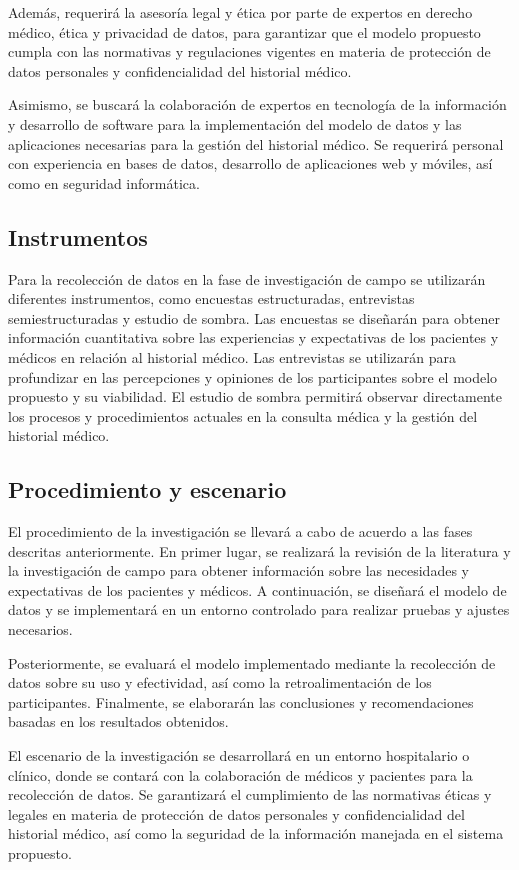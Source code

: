     Además, requerirá la asesoría legal y ética por parte de expertos en derecho médico, ética y privacidad de datos, para garantizar que el modelo propuesto cumpla con las normativas y regulaciones vigentes en materia de protección de datos personales y confidencialidad del historial médico.

    Asimismo, se buscará la colaboración de expertos en tecnología de la información y desarrollo de software para la implementación del modelo de datos y las aplicaciones necesarias para la gestión del historial médico. Se requerirá personal con experiencia en bases de datos, desarrollo de aplicaciones web y móviles, así como en seguridad informática.
    \subsection{Instrumentos}
    Para la recolección de datos en la fase de investigación de campo se utilizarán diferentes instrumentos, como encuestas estructuradas, entrevistas semiestructuradas y estudio de sombra. Las encuestas se diseñarán para obtener información cuantitativa sobre las experiencias y expectativas de los pacientes y médicos en relación al historial médico. Las entrevistas se utilizarán para profundizar en las percepciones y opiniones de los participantes sobre el modelo propuesto y su viabilidad. El estudio de sombra permitirá observar directamente los procesos y procedimientos actuales en la consulta médica y la gestión del historial médico.
    
    \subsection{Procedimiento y escenario}
    El procedimiento de la investigación se llevará a cabo de acuerdo a las fases descritas anteriormente. En primer lugar, se realizará la revisión de la literatura y la investigación de campo para obtener información sobre las necesidades y expectativas de los pacientes y médicos. A continuación, se diseñará el modelo de datos y se implementará en un entorno controlado para realizar pruebas y ajustes necesarios.

    Posteriormente, se evaluará el modelo implementado mediante la recolección de datos sobre su uso y efectividad, así como la retroalimentación de los participantes. Finalmente, se elaborarán las conclusiones y recomendaciones basadas en los resultados obtenidos.

    El escenario de la investigación se desarrollará en un entorno hospitalario o clínico, donde se contará con la colaboración de médicos y pacientes para la recolección de datos. Se garantizará el cumplimiento de las normativas éticas y legales en materia de protección de datos personales y confidencialidad del historial médico, así como la seguridad de la información manejada en el sistema propuesto.

    